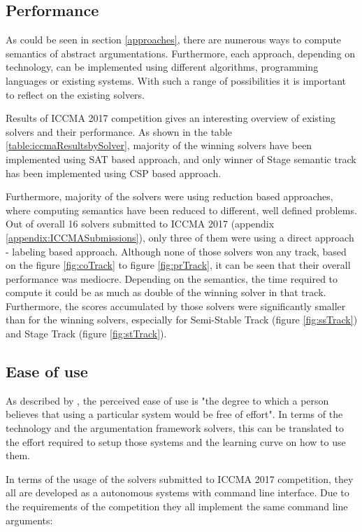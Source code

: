 \subsection{Performance}
As could be seen in section \ref{approaches}, there are numerous ways to compute semantics of abstract argumentations. Furthermore, each approach, depending on technology, can be implemented using different algorithms, programming languages or existing systems. With such a range of possibilities it is important to reflect on the existing solvers.

Results of ICCMA 2017 competition \citep{iccmaResults} gives an interesting overview of existing solvers and their performance. As shown in the table \ref{table:iccmaResultsbySolver}, majority of the winning solvers have been implemented using SAT based approach, and only winner of Stage semantic track has been implemented using CSP based approach. 

Furthermore, majority of the solvers were using reduction based approaches, where computing semantics have been reduced to different, well defined problems. Out of overall 16 solvers submitted to ICCMA 2017 (appendix \ref{appendix:ICCMASubmissions}), only three of them were using a direct approach - labeling based approach. Although none of those solvers won any track, based on the figure \ref{fig:coTrack} to figure \ref{fig:prTrack}, it can be seen that their overall performance was mediocre. Depending on the semantics, the time required to compute it could be as much as double of the winning solver in that track. Furthermore, the scores accumulated by those solvers were significantly smaller than for the winning solvers, especially for Semi-Stable Track (figure \ref{fig:ssTrack}) and Stage Track (figure \ref{fig:stTrack}).

\subsection{Ease of use}
As described by \citet{easeOfUse}, the perceived ease of use is "the degree to which a person believes that using a particular system would be free of effort". In terms of the technology and the argumentation framework solvers, this can be translated to the effort required to setup those systems and the learning curve on how to use them. 

In terms of the usage of the solvers submitted to ICCMA 2017 competition, they all are developed as a autonomous systems with command line interface. Due to the requirements of the competition they all implement the same command line arguments:

